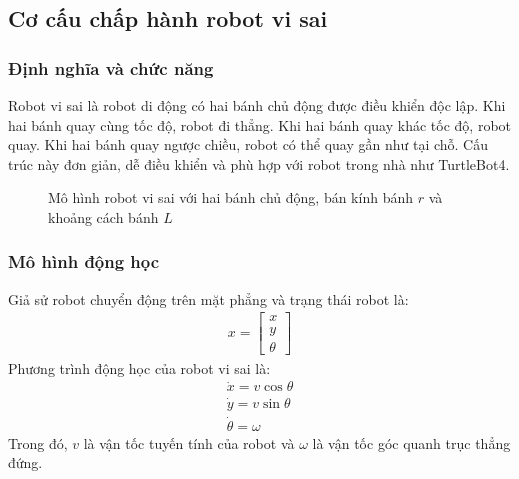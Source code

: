 \subsection{Cơ cấu chấp hành robot vi sai}\label{subsec:differential-drive}

\subsubsection{Định nghĩa và chức năng}

Robot vi sai là robot di động có hai bánh chủ động được điều khiển độc
lập. Khi hai bánh quay cùng tốc độ, robot đi thẳng. Khi hai bánh quay
khác tốc độ, robot quay. Khi hai bánh quay ngược chiều, robot có thể
quay gần như tại chỗ. Cấu trúc này đơn giản, dễ điều khiển và phù hợp
với robot trong nhà như TurtleBot4.

\begin{figure}[H]
\centering
{}
\caption{Mô hình robot vi sai với hai bánh chủ động, bán kính bánh $r$ và khoảng cách bánh $L$}
\label{fig:differential-drive-model}
\end{figure}

\subsubsection{Mô hình động học}

Giả sử robot chuyển động trên mặt phẳng và trạng thái robot là:
\begin{gather*}x = \begin{bmatrix}
x \\
y \\
\theta
\end{bmatrix}\end{gather*}
Phương trình động học của robot vi sai là:
\begin{gather*}\dot{x} = v\cos\theta \\[1.5ex]
\dot{y} = v\sin\theta \\[1.5ex]
\dot{\theta} = \omega\end{gather*}
Trong đó, \(v\) là vận tốc tuyến tính của robot và \(\omega\) là vận tốc
góc quanh trục thẳng đứng.

